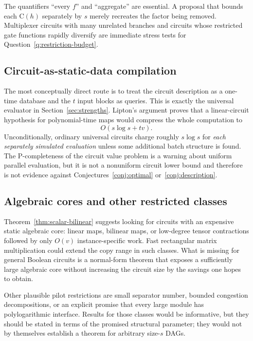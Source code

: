 \documentclass[11pt]{article}
\theoremstyle{definition}
\newcommand{\C}{\mathrm{C}}
\begin{document}
The quantifiers ``every $f$'' and ``aggregate'' are essential.  A proposal
that bounds each $\C(h)$ separately by $s$ merely recreates the factor being
removed.  Multiplexer circuits with many unrelated branches and circuits
whose restricted gate functions rapidly diversify are immediate stress
tests for Question~\ref{q:restriction-budget}.

\subsection{Circuit-as-static-data compilation}

The most conceptually direct route is to treat the circuit description as a
one-time database and the $t$ input blocks as queries.  This is exactly the
universal evaluator in Section~\ref{sec:strengths}.  Lipton's argument proves
that a linear-circuit hypothesis for polynomial-time maps would compress the
whole computation to
\[
  O(s\log s+tv).
\]
Unconditionally, ordinary universal circuits charge roughly $s\log s$ for
\emph{each separately simulated evaluation} unless some additional batch
structure is found.  The P-completeness of the circuit value problem
\cite{Ladner1975} is a warning about uniform parallel evaluation, but it is
not a nonuniform circuit lower bound and therefore is not evidence against
Conjectures~\ref{conj:optimal} or~\ref{conj:description}.

\subsection{Algebraic cores and other restricted classes}

Theorem~\ref{thm:scalar-bilinear} suggests looking for circuits with an
expensive static algebraic core: linear maps, bilinear maps, or low-degree
tensor contractions followed by only $O(v)$ instance-specific work.  Fast
rectangular matrix multiplication could extend the copy range in such
classes.  What is missing for general Boolean circuits is a normal-form
theorem that exposes a sufficiently large algebraic core without increasing
the circuit size by the savings one hopes to obtain.

Other plausible pilot restrictions are small separator number, bounded
congestion decompositions, or an explicit promise that every large module has
polylogarithmic interface.  Results for those classes would be informative,
but they should be stated in terms of the promised structural parameter; they
would not by themselves establish a theorem for arbitrary size-$s$ DAGs.
\end{document}
